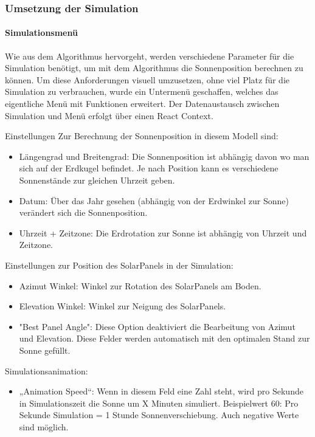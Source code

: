 \subsubsection{Umsetzung der Simulation}

\paragraph{Simulationsmenü}

Wie aus dem Algorithmus hervorgeht, werden verschiedene Parameter für die Simulation benötigt, um mit dem Algorithmus die Sonnenposition berechnen zu können.
Um diese Anforderungen visuell umzusetzen, ohne viel Platz für die Simulation zu verbrauchen, wurde ein Untermenü geschaffen, welches das eigentliche Menü mit Funktionen erweitert. Der Datenaustausch zwischen Simulation und Menü erfolgt über einen React Context.

Einstellungen Zur Berechnung der Sonnenposition in diesem Modell sind:
\begin{itemize}
    \item Längengrad und Breitengrad: Die Sonnenposition ist abhängig davon wo man sich auf der Erdkugel befindet. Je nach Position kann es verschiedene Sonnenstände zur gleichen Uhrzeit geben.
    \item Datum: Über das Jahr gesehen (abhängig von der Erdwinkel zur Sonne) verändert sich die Sonnenposition.
    \item Uhrzeit + Zeitzone: Die Erdrotation zur Sonne ist abhängig von Uhrzeit und Zeitzone.
\end{itemize}

Einstellungen zur Position des SolarPanels in der Simulation:
\begin{itemize}
    \item Azimut Winkel: Winkel zur Rotation des SolarPanels am Boden.
    \item Elevation Winkel: Winkel zur Neigung des SolarPanels.
    \item "Best Panel Angle": Diese Option deaktiviert die Bearbeitung von Azimut und Elevation. Diese Felder werden automatisch mit den optimalen Stand zur Sonne gefüllt.
\end{itemize}

Simulationsanimation:
\begin{itemize}
    \item „Animation Speed“: Wenn in diesem Feld eine Zahl steht, wird pro Sekunde in Simulationszeit die Sonne um X Minuten simuliert. Beispielwert 60: Pro Sekunde Simulation = 1 Stunde Sonnenverschiebung. Auch negative Werte sind möglich.
\end{itemize}

